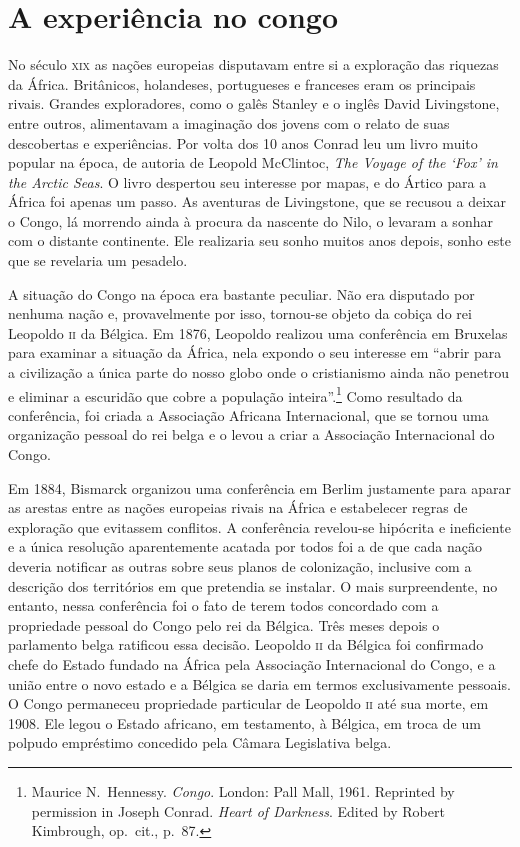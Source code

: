 \section{A experiência no congo}

No século \textsc{xix} as nações europeias disputavam entre si a exploração das
riquezas da África. Britânicos, holandeses, portugueses e franceses
eram os principais rivais. Grandes exploradores, como o galês Stanley e
o inglês David Livingstone, entre outros, alimentavam a imaginação dos
jovens com o relato de suas descobertas e experiências. Por volta dos
10 anos Conrad leu um livro muito popular na época, de autoria de
Leopold  McClintoc, \textit{The Voyage of the `Fox' in the Arctic
Seas}. O livro despertou seu interesse por mapas, e do Ártico para a
África foi apenas um passo. As aventuras de Livingstone, que se recusou
a deixar o Congo, lá morrendo ainda à procura da nascente do Nilo, o
levaram a sonhar com o distante continente. Ele realizaria seu sonho
muitos anos depois, sonho este que se revelaria um pesadelo.

A situação do Congo na época era bastante peculiar. Não era
disputado por  nenhuma nação e, provavelmente por isso, tornou{}-se
objeto da cobiça do rei Leopoldo \textsc{ii} da Bélgica. Em 1876, Leopoldo
realizou uma conferência em Bruxelas para examinar a situação da
África, nela expondo o seu interesse em ``abrir para a civilização a
única parte do nosso globo onde o cristianismo ainda não penetrou e
eliminar a escuridão que cobre a população \mbox{inteira}''.\footnote{ Maurice 
N.~Hennessy. \textit{Congo}. London: Pall Mall, 1961. Reprinted by
permission in Joseph Conrad. \textit{Heart of Darkness}. Edited by
Robert Kimbrough, op.~cit., p.~87.} 
Como resultado da conferência, foi criada a Associação Africana
Internacional, que se tornou uma organização pessoal do rei belga e o
levou a criar a Associação Internacional do Congo.


Em 1884, Bismarck organizou uma conferência em Berlim justamente para
aparar as arestas entre as nações europeias rivais na África e
estabelecer regras de exploração que evitassem conflitos. A conferência
revelou{}-se hipócrita e ineficiente e a única resolução aparentemente
acatada por todos foi a de que cada nação deveria notificar as outras
sobre seus planos de colonização, inclusive com a descrição dos
territórios em que pretendia se instalar.  O mais surpreendente, no
entanto, nessa conferência foi o fato de terem todos concordado com a
propriedade pessoal do Congo pelo rei da Bélgica. Três meses depois o
parlamento belga ratificou essa decisão. Leopoldo \textsc{ii} da Bélgica foi
confirmado chefe do Estado fundado na África pela Associação Internacional do Congo, 
e a união entre o novo estado e a Bélgica se
daria em termos exclusivamente pessoais. O Congo permaneceu propriedade
particular de Leopoldo \textsc{ii} até sua morte, em 1908. Ele legou o Estado
africano, em  testamento, à Bélgica, em troca de um polpudo empréstimo
concedido pela Câmara Legislativa belga.


